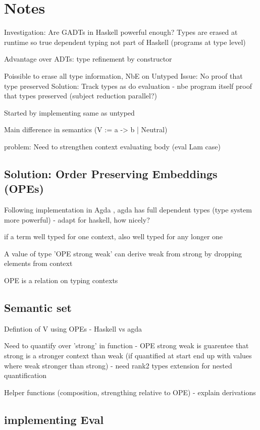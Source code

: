 
\section{Notes}

Investigation: Are GADTs in Haskell powerful enough? Types are erased at runtime so true dependent typing not part of Haskell (programs at type level)

Advantage over ADTs: type refinement by constructor

Poissible to erase all type information, NbE on Untyped
Issue: No proof that type preserved 
Solution: Track types as do evaluation - nbe program itself proof that types preserved (subject reduction parallel?)

Started by implementing same as untyped

Main difference in semantics (V := a -> b | Neutral) 
\cite{slides}

problem: Need to strengthen context evaluating body (eval Lam case)
\subsection{Solution: Order Preserving Embeddings (OPEs)}

Following implementation in Agda \cite{AgdaNbe}, agda has full dependent types (type system more powerful) - adapt for haskell, how nicely? 

if a term well typed for one context, also well typed for any longer one

A value of type 'OPE strong weak' can derive weak from strong by dropping elements from context

OPE is a relation on typing contexts

\subsection{Semantic set}

Defintion of V using OPEs - Haskell vs agda

Need to quantify over 'strong' in function - OPE strong weak is guarentee that strong is a stronger context than weak (if quantified at start end up with values where weak stronger than strong) - need rank2 types extension for nested quantification

Helper functions (composition, strengthing relative to OPE) - explain derivations

\subsection{implementing Eval}

